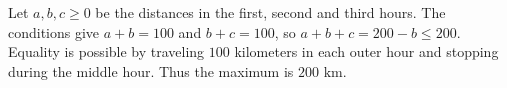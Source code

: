 Let $a,b,c\ge0$ be the distances in the first, second and third hours. The conditions give $a+b=100$ and $b+c=100$, so $a+b+c=200-b\le200$. Equality is possible by traveling $100$ kilometers in each outer hour and stopping during the middle hour. Thus the maximum is $\boxed{200\text{ km}}$.
